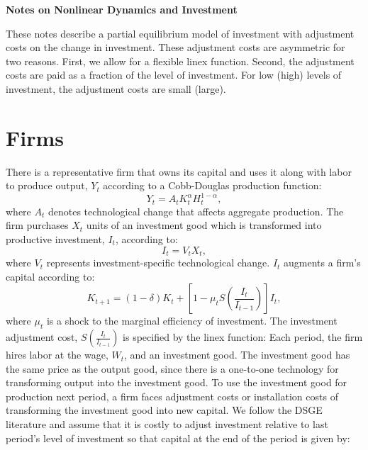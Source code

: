 \documentclass[11pt,fleqn]{article}
\begin{document}
\doublespacing

\begin{center}
\textbf{\Large Notes on Nonlinear Dynamics and Investment}
\end{center}

These notes describe a partial equilibrium model of investment with adjustment costs on the change in investment.  These adjustment costs are asymmetric for two reasons.  First, we allow for a flexible linex function.  Second, the adjustment costs are paid as a fraction of the level of investment.  For low (high) levels of investment, the adjustment costs are small (large). 

\section{Firms}

There is a representative firm that owns its capital and uses it along with labor to produce output, $Y_t$ according to a Cobb-Douglas production function:
\begin{equation}
Y_t = A_t K^{\alpha}_t H^{1-\alpha}_t,  \label{production_function}
\end{equation}
where $A_t$ denotes technological change that affects aggregate production.
The firm purchases $X_t$ units of an investment good which is transformed into productive investment, $I_t$, according to:
\begin{equation}
I_t = V_t X_t,
\end{equation}
where $V_t$ represents investment-specific technological change. $I_t$ augments a firm's capital according to:
\begin{equation} 
K_{t+1} = (1-\delta) K_t +\left[1- \mu_t S\left(\frac{I_t}{I_{t-1}}\right) \right] I_t,  \label{capital_accumulation}
\end{equation}
where $\mu_t$ is a shock to the marginal efficiency of investment.  The investment adjustment cost, $S\left(\frac{I_t}{I_{t-1}}\right)$ is specified by the linex function:
Each period, the firm hires labor at the wage, $W_t$, and an investment good.  The investment good has the same price as the output good, since there is a one-to-one technology for transforming output into the investment good.  To use the investment good for production next period, a firm faces adjustment costs or installation costs of transforming the investment good into new capital.  We follow the DSGE literature and assume that it is costly to adjust investment relative to last period's level of investment so that capital at the end of the period is given by:
\end{document}

